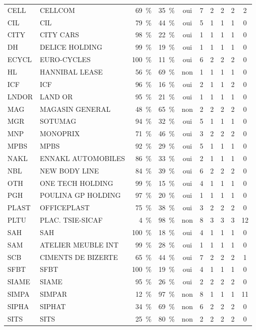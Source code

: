 \begin{longtable}{llrrcccccc}
CELL & CELLCOM & 69~\% & 35~\% & oui & 7 & 2 & 2 & 2 & 2 \\
CIL & CIL & 79~\% & 44~\% & oui & 5 & 1 & 1 & 1 & 0 \\
CITY & CITY CARS & 98~\% & 22~\% & oui & 1 & 1 & 1 & 1 & 0 \\
DH & DELICE HOLDING & 99~\% & 19~\% & oui & 1 & 1 & 1 & 1 & 0 \\
ECYCL & EURO-CYCLES & 100~\% & 11~\% & oui & 6 & 2 & 2 & 2 & 0 \\
HL & HANNIBAL LEASE & 56~\% & 69~\% & non & 1 & 1 & 1 & 1 & 0 \\
ICF & ICF & 96~\% & 16~\% & oui & 2 & 1 & 1 & 2 & 0 \\
LNDOR & LAND OR & 95~\% & 21~\% & oui & 1 & 1 & 1 & 1 & 0 \\
MAG & MAGASIN GENERAL & 48~\% & 65~\% & non & 2 & 2 & 2 & 2 & 0 \\
MGR & SOTUMAG & 94~\% & 32~\% & oui & 5 & 1 & 1 & 1 & 0 \\
MNP & MONOPRIX & 71~\% & 46~\% & oui & 3 & 2 & 2 & 2 & 0 \\
MPBS & MPBS & 92~\% & 29~\% & oui & 5 & 1 & 1 & 1 & 0 \\
NAKL & ENNAKL AUTOMOBILES & 86~\% & 33~\% & oui & 2 & 1 & 1 & 1 & 0 \\
NBL & NEW BODY LINE & 84~\% & 39~\% & oui & 6 & 2 & 2 & 2 & 0 \\
OTH & ONE TECH HOLDING & 99~\% & 15~\% & oui & 4 & 1 & 1 & 1 & 0 \\
PGH & POULINA GP HOLDING & 97~\% & 20~\% & oui & 1 & 1 & 1 & 1 & 0 \\
PLAST & OFFICEPLAST & 75~\% & 38~\% & oui & 3 & 2 & 2 & 2 & 0 \\
PLTU & PLAC. TSIE-SICAF & 4~\% & 98~\% & non & 8 & 3 & 3 & 3 & 12 \\
SAH & SAH & 100~\% & 18~\% & oui & 4 & 1 & 1 & 1 & 0 \\
SAM & ATELIER MEUBLE INT & 99~\% & 28~\% & oui & 1 & 1 & 1 & 1 & 0 \\
SCB & CIMENTS DE BIZERTE & 65~\% & 44~\% & oui & 7 & 2 & 2 & 2 & 1 \\
SFBT & SFBT & 100~\% & 19~\% & oui & 4 & 1 & 1 & 1 & 0 \\
SIAME & SIAME & 95~\% & 26~\% & oui & 2 & 2 & 2 & 2 & 0 \\
SIMPA & SIMPAR & 12~\% & 97~\% & non & 8 & 1 & 1 & 1 & 11 \\
SIPHA & SIPHAT & 34~\% & 69~\% & non & 6 & 2 & 2 & 2 & 0 \\
SITS & SITS & 25~\% & 80~\% & non & 2 & 2 & 2 & 2 & 0 \\

\end{longtable}
